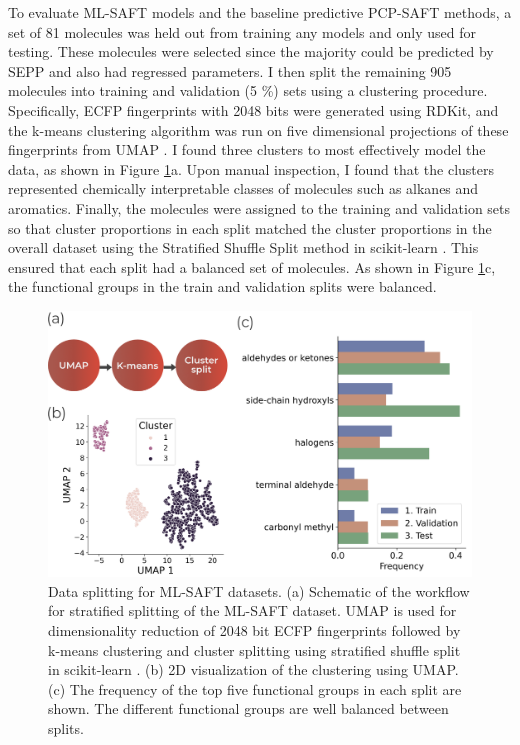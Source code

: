 To evaluate ML-SAFT models and the baseline predictive PCP-SAFT methods, a set of 81 molecules was held out from training any models and only used for testing. These molecules were selected since the majority could be predicted by SEPP and also had regressed parameters. I then split the remaining 905 molecules into training and validation (5 \%) sets using a clustering procedure. Specifically, ECFP fingerprints with 2048 bits were generated using RDKit, and the k-means clustering algorithm \cite{MacQueen1967} was run on five dimensional projections of these fingerprints from UMAP \cite{McInnes2018}. I found three clusters to most effectively model the data, as shown in Figure \ref{fig:splitting}a. Upon manual inspection, I found that the clusters represented chemically interpretable classes of molecules such as alkanes and aromatics. Finally, the molecules were assigned to the training and validation sets so that cluster proportions in each split matched the cluster proportions in the overall dataset using the Stratified Shuffle Split method in scikit-learn \cite{scikit-learn}. This ensured that each split had a balanced set of molecules. As shown in Figure \ref{fig:splitting}c, the functional groups in the train and validation splits were balanced. 

\begin{figure}
    \centering
    \includegraphics[width=\textwidth]{gfx/Chapter08/cluster_split.png}
    \caption{Data splitting for ML-SAFT datasets. (a) Schematic of the workflow for stratified splitting of the ML-SAFT dataset. UMAP \cite{McInnes2018} is used for dimensionality reduction of 2048 bit ECFP fingerprints followed by k-means clustering \cite{MacQueen1967} and cluster splitting using stratified shuffle split in scikit-learn \cite{scikit-learn}. (b) 2D visualization of the clustering using UMAP. (c) The frequency of the top five functional groups in each split are shown. The different functional groups are well balanced between splits.}
    \label{fig:splitting}
\end{figure}

